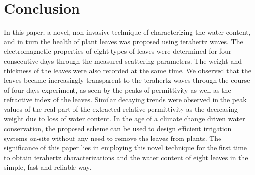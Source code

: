 \documentclass[journal,article,submit,moreauthors,pdftex]{Definitions/mdpi}
\renewcommand{\^}{\hat}  %
\begin{document}
\section{Conclusion}
\label{sec:conclusion}
%

In this paper, a novel, non-invasive technique of characterizing the water content, and in turn the health of plant leaves was proposed using terahertz waves. The electromagnetic properties of eight types of leaves were determined for four consecutive days through the measured scattering parameters. The weight and thickness of the leaves were also recorded at the same time. We observed that the leaves became increasingly transparent to the terahertz waves through the course of four days experiment, as seen by the peaks of permittivity as well as the refractive index of the leaves. Similar decaying trends were observed in the peak values of the real part of the extracted relative permittivity as the decreasing weight due to loss of water content. In the age of a climate change driven water conservation, the proposed scheme can be used to design efficient irrigation systems on-site without any need to remove the leaves from plants. The significance of this paper lies in employing this novel technique for the first time to obtain terahertz characterizations and the water content of eight leaves in the simple, fast and reliable way.
\end{document}
